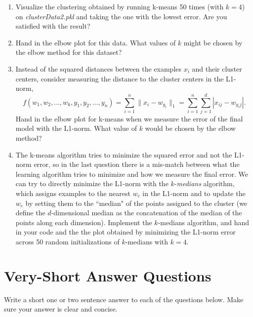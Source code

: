 \documentclass{article}
\def\blu#1{{\color{blu}#1}}
\def\norm#1{\|#1\|}
\def\enum#1{\begin{enumerate}#1\end{enumerate}}
\begin{document}
 \blu{\enum{
 \item Visualize the clustering obtained by running k-means 50 times (with $k=4$) on \emph{clusterData2.pkl} and taking the one with the lowest error. Are you satisfied with the result?
 \item Hand in the elbow plot for this data. What values of $k$ might be chosen by the elbow method for this dataset?
 \item Instead of the squared distances between the examples $x_i$ and their cluster centers, consider measuring the distance to the cluster centers in the L1-norm,
\[
f(w_1,w_2,\dots,w_k,y_1,y_2,\dots,y_n) = \sum_{i=1}^n \norm{x_i - w_{y_i}}_1 = \sum_{i=1}^n \sum_{j=1}^d |x_{ij} - w_{y_ij}|.
\]
Hand in the elbow plot for k-means when we measure the error of the final model with the L1-norm.
What value of $k$ would be chosen by the elbow method?
 \item The k-means algorithm tries to minimize the squared error and not the L1-norm error, so in the last question there is a mis-match between what the learning algorithm tries to minimize and how we measure the final error. We can try to directly minimize the L1-norm with the $k$-\emph{medians} algorithm, which assigns examples to the nearest $w_c$ in the L1-norm and to update the $w_c$ by setting them to the ``median" of the points assigned to the cluster (we define the $d$-dimensional median as the concatenation of the median of the points along each dimension). Implement the $k$-medians algorithm, and hand in your code and the the plot obtained by minimizing the L1-norm error across 50 random initializations of $k$-medians with $k=4$.
}
}
\pagebreak

\section{Very-Short Answer Questions}

\blu{Write a short one or two sentence answer to each of the questions below}. Make sure your answer is clear and concise.
\end{document}
